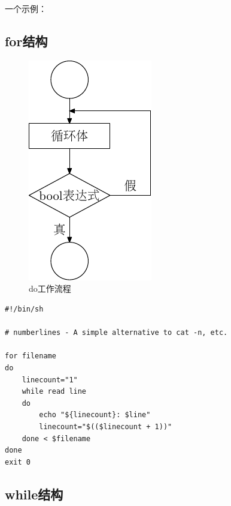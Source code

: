 一个示例：



\subsection{for结构}

\begin{figure}[!htbp]
  \centering
  \includegraphics{graph/do-1.pdf}
    \caption{do工作流程}
  \label{fig:do_workflow}
\end{figure}

\begin{lstlisting}
#!/bin/sh

# numberlines - A simple alternative to cat -n, etc.

for filename
do
    linecount="1"
    while read line
    do
        echo "${linecount}: $line"
        linecount="$(($linecount + 1))"
    done < $filename
done
exit 0
\end{lstlisting}

\subsection{while结构}

